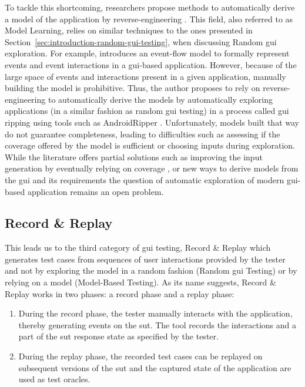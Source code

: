 To tackle this shortcoming, researchers propose methods to automatically derive a model of the application by reverse-engineering \cite{DiLucca2002, Memon2003, Amalfitano2015, Canny2020}. This field, also referred to as Model Learning, relies on similar techniques to the ones presented in Section~\ref{sec:introduction-random-gui-testing}, when discussing Random \gls{gui} exploration. For example, \textcite{Memon2007} introduces an event-flow model to formally represent events and event interactions in a \gls{gui}-based application. However, because of the large space of events and interactions present in a given application, manually building the model is prohibitive. Thus, the author proposes to rely on reverse-engineering to automatically derive the models by automatically exploring applications (in a similar fashion as random \gls{gui} testing) in a process called \gls{gui} ripping \cite{Memon2003} using tools such as AndroidRipper \cite{Amalfitano2012}. Unfortunately, models built that way do not guarantee completeness, leading to difficulties such as assessing if the coverage offered by the model is sufficient or choosing inputs during exploration. While the literature offers partial solutions such as improving the input generation \cite{Biagiola2019} by eventually relying on coverage \cite{Yuan2007}, or new ways to derive models from the \gls{gui} and its requirements \cite{Canny2020} the question of automatic exploration of modern \gls{gui}-based application remains an open problem.

\subsection{Record \& Replay}
\label{sec:introduction-record-and-replay}

This leads us to the third category of \gls{gui} testing, Record \& Replay which generates test cases from sequences of user interactions provided by the tester and not by exploring the model in a random fashion (Random \gls{gui} Testing) or by relying on a model (Model-Based Testing). As its name suggests, Record \& Replay works in two phases: a record phase and a replay phase:

\begin{enumerate}
    \item During the record phase, the tester manually interacts with the application, thereby generating events on the \gls{sut}. The tool records the interactions and a part of the \gls{sut} response state as specified by the tester.
    \item During the replay phase, the recorded test cases can be replayed on subsequent versions of the \gls{sut} and the captured state of the application are used as test oracles.
\end{enumerate}

